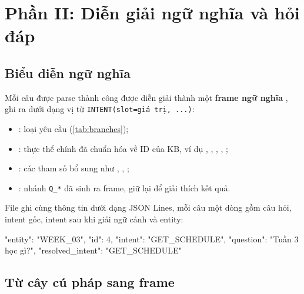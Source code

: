 \section{Phần II: Diễn giải ngữ nghĩa và hỏi đáp}
\label{sec:part2}

\subsection{Biểu diễn ngữ nghĩa}

Mỗi câu được parse thành công được diễn giải thành một \textbf{frame ngữ nghĩa}
, ghi ra  dưới dạng vị từ
\texttt{INTENT(slot=giá trị, ...)}:
\begin{itemize}
  \item {}: loại yêu cầu (\cref{tab:branches});
  \item {}: thực thể chính đã chuẩn hóa về ID của KB, ví dụ ,
        , , , ;
  \item {}: các tham số bổ sung như ,
        , ;
  \item {}: nhánh \texttt{Q\_*} đã sinh ra frame, giữ lại để giải
        thích kết quả.
\end{itemize}
File  ghi cùng thông tin dưới dạng JSON Lines, mỗi câu một
dòng gồm câu hỏi, intent gốc, intent sau khi giải ngữ cảnh và entity:
\begin{trace}
{"entity": "WEEK_03", "id": 4, "intent": "GET_SCHEDULE", "question": "Tuần 3 học gì?", "resolved_intent": "GET_SCHEDULE"}
\end{trace}

\subsection{Từ cây cú pháp sang frame}

